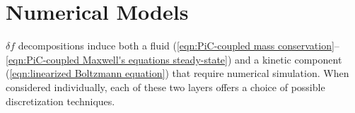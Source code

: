 \section{Numerical Models}\label{cha:FEM vs. PiC}
    $\delta\!f$ decompositions induce both a fluid (\ref{eqn:PiC-coupled mass conservation}--\ref{eqn:PiC-coupled Maxwell's equations steady-state}) and a kinetic component (\ref{eqn:linearized Boltzmann equation}) that require numerical simulation. When considered individually, each of these two layers offers a choice of possible discretization techniques.
    
    \line

    
    

    \line

